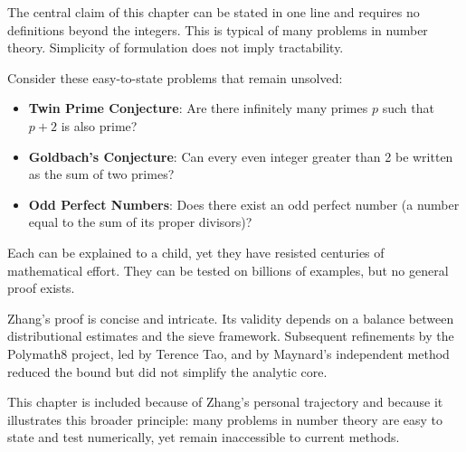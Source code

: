 \begin{commentary}
The central claim of this chapter can be stated in one line and requires no definitions beyond the integers. This is typical of many problems in number theory. Simplicity of formulation does not imply tractability.

Consider these easy-to-state problems that remain unsolved:
\begin{itemize}
\item \textbf{Twin Prime Conjecture}: Are there infinitely many primes $p$ such that $p+2$ is also prime?
\item \textbf{Goldbach's Conjecture}: Can every even integer greater than 2 be written as the sum of two primes?
\item \textbf{Odd Perfect Numbers}: Does there exist an odd perfect number (a number equal to the sum of its proper divisors)?
\end{itemize}

Each can be explained to a child, yet they have resisted centuries of mathematical effort. They can be tested on billions of examples, but no general proof exists.

Zhang's proof is concise and intricate. Its validity depends on a balance between distributional estimates and the sieve framework. Subsequent refinements by the Polymath8 project, led by Terence Tao, and by Maynard's independent method reduced the bound but did not simplify the analytic core.

This chapter is included because of Zhang's personal trajectory and because it illustrates this broader principle: many problems in number theory are easy to state and test numerically, yet remain inaccessible to current methods.
\end{commentary}
